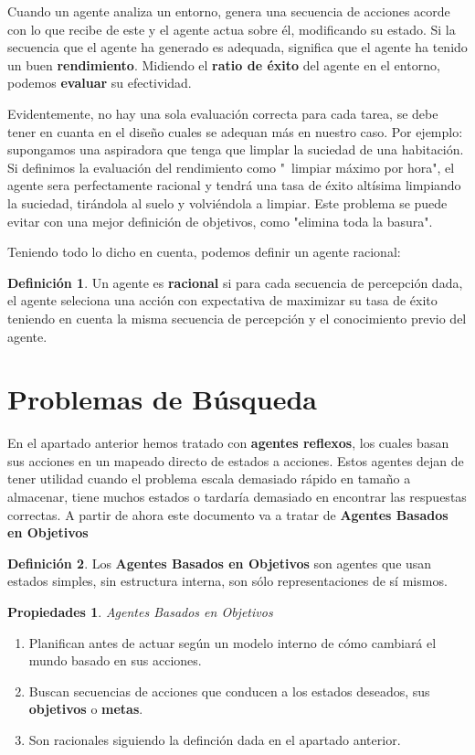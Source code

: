 \documentclass[12pt,a4paper,catalan, leqno]{article} %
\theoremstyle{definition}
\newtheorem*{propt}{Propiedades}
\newtheorem{defn}{Definición}[section]
\begin{document}
Cuando un agente analiza un entorno, genera una secuencia de acciones acorde con lo que recibe de este y el agente actua sobre él, modificando su estado. Si la secuencia que el agente ha generado es adequada, significa que el agente ha tenido un buen \textbf{rendimiento}. Midiendo el \textbf{ratio de éxito} del agente en el entorno, podemos \textbf{evaluar} su efectividad.

Evidentemente, no hay una sola evaluación correcta para cada tarea, se debe tener en cuanta en el diseño cuales se adequan más en nuestro caso. Por ejemplo: supongamos una aspiradora que tenga que limplar la suciedad de una habitación. Si definimos la evaluación del rendimiento como "\ limpiar máximo por hora", el agente sera perfectamente racional y tendrá una tasa de éxito altísima limpiando la suciedad, tirándola al suelo y volviéndola a limpiar. Este problema se puede evitar con una mejor definición de objetivos, como "elimina toda la basura".

Teniendo todo lo dicho en cuenta, podemos definir un agente racional:

\begin{defn}
Un agente es \textbf{racional} si para cada secuencia de percepción dada, el agente seleciona una acción con expectativa de maximizar su tasa de éxito teniendo en cuenta la misma secuencia de percepción y el conocimiento previo del agente.
\end{defn}

\pagebreak

\section{Problemas de Búsqueda}

En el apartado anterior hemos tratado con \textbf{agentes reflexos}, los cuales basan sus acciones en un mapeado directo de estados a acciones. Estos agentes dejan de tener utilidad cuando el problema escala demasiado rápido en tamaño a almacenar, tiene muchos estados o tardaría demasiado en encontrar las respuestas correctas. A partir de ahora este documento va a tratar de \textbf{Agentes Basados en Objetivos}

\begin{defn}
Los \textbf{Agentes Basados en Objetivos} son agentes que usan estados simples, sin estructura interna, son sólo representaciones de sí mismos.
\end{defn}

\begin{propt} \textit{Agentes Basados en Objetivos}
\begin{enumerate}
    \item Planifican antes de actuar según un modelo interno de cómo cambiará el mundo basado en sus acciones.
    \item Buscan secuencias de acciones que conducen a los estados deseados, sus \textbf{objetivos} o \textbf{metas}.
    \item Son racionales siguiendo la definción dada en el apartado anterior.
\end{enumerate}
\end{propt}
\end{document}
